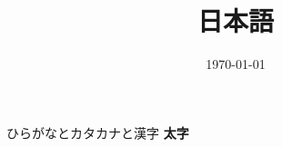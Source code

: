 \documentclass[11pt,a4paper]{article}
\title{日本語}
\author{}
\date{\today}
\begin{document}
\maketitle
ひらがなとカタカナと漢字 \textbf{太字}
\end{document}
